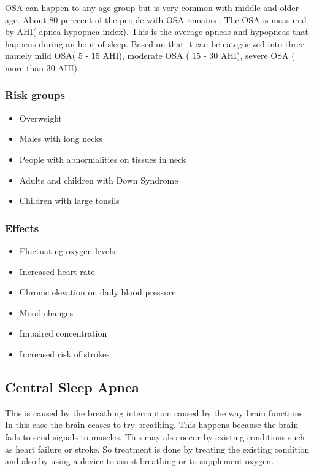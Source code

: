 \documentclass{report}
\begin{document}
        OSA can happen to any age group but is very common with middle and older age. About 80 perccent of the people with OSA remains . The OSA is measured by AHI( apnea hypopnea index). This is the average apneas and hypopneas that happens during an hour of sleep. Based on that it can be categorized into three namely mild OSA( 5 - 15 AHI), moderate OSA ( 15 - 30 AHI),  severe OSA ( more than 30 AHI).\\
        
    \subsubsection{Risk groups}
    \begin{itemize}
    \item Overweight
    \item Males with long necks
    \item People with abnormalities on tissues in neck
    \item Adults and children with Down Syndrome
    \item Children with large tonsils
    \end{itemize}
    
    \subsubsection{Effects}
    
    \begin{itemize}
        \item Fluctuating oxygen levels
        \item Increased heart rate
        \item Chronic elevation on daily blood pressure
        \item Mood changes
        \item Impaired concentration
        \item Increased risk of strokes 
    \end{itemize}
    
    
\subsection{Central Sleep Apnea}   

This is caused by the breathing interruption caused by the way brain functions. In this case the brain ceases to try breathing. This happens because the brain fails to send signals to muscles. This may also occur by existing conditions such as heart failure or stroke. So treatment is done by treating the existing condition and also by using a device to assist breathing or to supplement oxygen.
\end{document}
